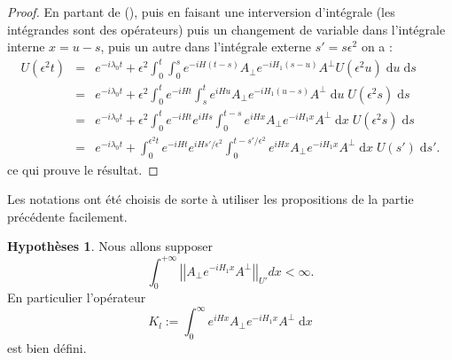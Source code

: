 \documentclass[12pt,openany,a4paper, titlepage]{article}
\newcommand{\lb}{\left|}
\newcommand{\rb}{\right|}
\newcommand{\dd}{\;\mathrm{d}}
\newcommand{\St}[2]{e^{-i #1 #2}}
\newcommand{\Stt}[2]{e^{i #1 #2}}
\theoremstyle{definition}
\newtheorem{ass}{Hypothèses}
\theoremstyle{definition}
\theoremstyle{definition}
\theoremstyle{definition}
\theoremstyle{definition}
\theoremstyle{definition}
\begin{document}
\begin{proof}
En partant de (), puis en faisant une interversion d'intégrale (les intégrandes sont des opérateurs) puis un changement de variable dans l'intégrale interne $x = u -s$, puis un autre dans l'intégrale externe $s' = s\epsilon^2$ on a :
\begin{eqnarray}
    U(\epsilon^2t) &=&  \St{\lambda_0}{t} + \epsilon^2\int_0^t\int_0^s \St{H}{(t-s)}A_\perp \St{H_1}{(s-u)}A^\perp U(\epsilon^2u) \dd u \dd s \\
                   &=&  \St{\lambda_0}{t} + \epsilon^2\int_0^t\St{H}{t}\int_s^t \Stt{H}{u}A_\perp \St{H_1}{(u-s)}A^\perp \dd u \;U(\epsilon^2s) \dd s \\
                   &=&  \St{\lambda_0}{t} + \epsilon^2\int_0^t\St{H}{t}\Stt{H}{s}\int_0^{t-s} \Stt{H}{x}A_\perp \St{H_1}{x}A^\perp \dd x \; U(\epsilon^2s) \dd s \\
                   &=&  \St{\lambda_0}{t} + \int_0^{\epsilon^2t}\St{H}{t}\Stt{H}{s'/\epsilon^2}\int_0^{t-s'/\epsilon^2} \Stt{H}{x}A_\perp \St{H_1}{x}A^\perp \dd x \; U(s') \dd s'.
\end{eqnarray}
ce qui prouve le résultat.
\end{proof}

Les notations ont été choisis de sorte à utiliser les propositions de la partie précédente facilement.

\begin{ass}
Nous allons supposer 
\begin{equation}
    \int_0^{+\infty} \lb\lb A_\perp \St{H_1}{x}A^\perp \rb\rb_{U'} dx < \infty.
\end{equation}
En particulier l'opérateur 
\begin{equation}
    K_l := \int_0^{\infty} \Stt{H}{x}A_\perp \St{H_1}{x}A^\perp \dd x
\end{equation}
est bien défini.
\end{ass}
\end{document}
